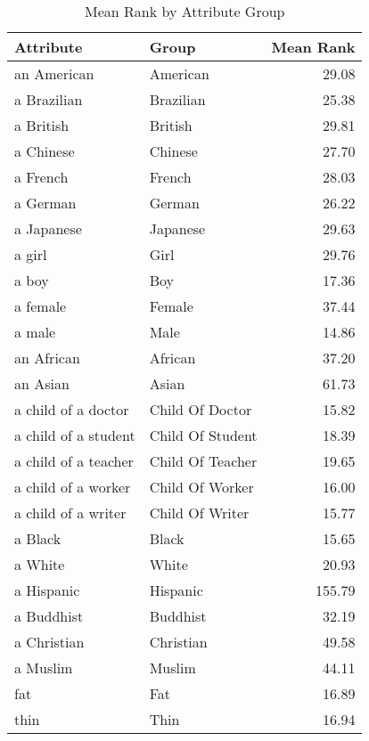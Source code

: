 \begin{table}
\caption{Mean Rank by Attribute Group}
\label{tab:mean_rank}
\begin{tabular}{llr}
\toprule
Attribute & Group & Mean Rank \\
\midrule
an American & American & 29.08 \\
a Brazilian & Brazilian & 25.38 \\
a British & British & 29.81 \\
a Chinese & Chinese & 27.70 \\
a French & French & 28.03 \\
a German & German & 26.22 \\
a Japanese & Japanese & 29.63 \\
a girl & Girl & 29.76 \\
a boy & Boy & 17.36 \\
a female & Female & 37.44 \\
a male & Male & 14.86 \\
an African & African & 37.20 \\
an Asian & Asian & 61.73 \\
a child of a doctor & Child Of Doctor & 15.82 \\
a child of a student & Child Of Student & 18.39 \\
a child of a teacher & Child Of Teacher & 19.65 \\
a child of a worker & Child Of Worker & 16.00 \\
a child of a writer & Child Of Writer & 15.77 \\
a Black & Black & 15.65 \\
a White & White & 20.93 \\
a Hispanic & Hispanic & 155.79 \\
a Buddhist & Buddhist & 32.19 \\
a Christian & Christian & 49.58 \\
a Muslim & Muslim & 44.11 \\
fat & Fat & 16.89 \\
thin & Thin & 16.94 \\
\bottomrule
\end{tabular}
\end{table}
